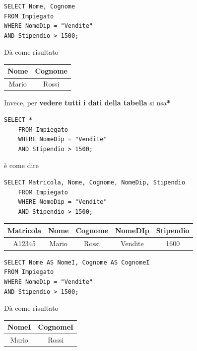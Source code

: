\documentclass{article}
\begin{document}
\begin{minipage}{0.45\linewidth}
\begin{lstlisting}[style=sqlstyle]
SELECT Nome, Cognome
FROM Impiegato
WHERE NomeDip = "Vendite"
AND Stipendio > 1500;
\end{lstlisting}
\end{minipage}
\begin{minipage}{0.45\linewidth}
	\hfill
	Dà come risultato \hfill
\begin{tabular}{|c|c|}
	\hline
	\textbf{Nome} & \textbf{Cognome} \\
	\hline
	Mario & Rossi \\
	\hline
\end{tabular}
\end{minipage}


Invece, per \textbf{vedere tutti i dati della tabella} si usa\textbf{*}
\begin{lstlisting}[style=sqlstyle]
	SELECT *
	FROM Impiegato
	WHERE NomeDip = "Vendite"
	AND Stipendio > 1500;
\end{lstlisting}

è come dire 

\begin{lstlisting}[style=sqlstyle]
	SELECT Matricola, Nome, Cognome, NomeDip, Stipendio
	FROM Impiegato
	WHERE NomeDip = "Vendite"
	AND Stipendio > 1500;
\end{lstlisting}

\begin{tabular}{|c|c|c|c|c|}
	\hline
	\textbf{Matricola} & \textbf{Nome} & \textbf{Cognome} & \textbf{NomeDIp} & \textbf{Stipendio} \\
	\hline
	A12345 & Mario & Rossi & Vendite & 1600 \\
	\hline
\end{tabular}

\vspace{1em}

\begin{minipage}{0.45\linewidth}
\begin{lstlisting}[style=sqlstyle]
SELECT Nome AS NomeI, Cognome AS CognomeI
FROM Impiegato
WHERE NomeDip = "Vendite"
AND Stipendio > 1500;
\end{lstlisting}

\end{minipage}
\begin{minipage}{0.45\linewidth}
	\hfill
	Dà come risultato \hfill
	\begin{tabular}{|c|c|}
		\hline
		\textbf{NomeI} & \textbf{CognomeI} \\
		\hline
		Mario & Rossi \\
		\hline
	\end{tabular}
\end{minipage}
\end{document}
